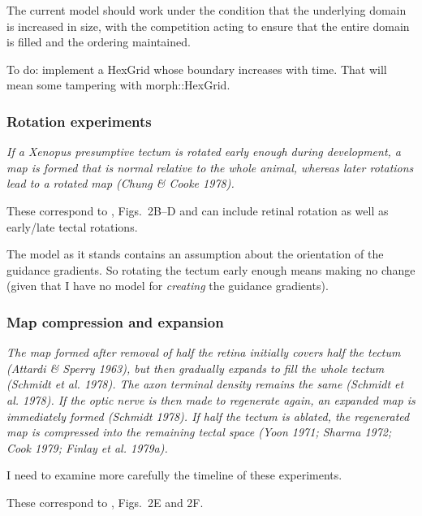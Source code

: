 \documentclass[11pt, a4paper]{article}
\newcommand{\code}[1]{\textsf{#1}}
\begin{document}
The current model should work under the condition that the underlying domain
is increased in size, with the competition acting to ensure that the entire
domain is filled and the ordering maintained.

To do: implement a HexGrid whose boundary increases with time. That will mean
some tampering with \code{morph::HexGrid}.

\subsubsection{Rotation experiments}

\begin{displayquote}
\emph{If a Xenopus presumptive tectum is rotated early enough during development,
a map is formed that is normal relative to the whole animal, whereas later
rotations lead to a rotated map (Chung \& Cooke 1978).}
\end{displayquote}

These correspond to \cite{goodhill_retinotectal_1999}, Figs.~2B--D and can
include retinal rotation as well as early/late tectal rotations.

The model as it stands contains an assumption about the orientation of the
guidance gradients. So rotating the tectum early enough means making no change
(given that I have no model for \emph{creating} the guidance gradients).

\subsubsection{Map compression and expansion}

\begin{displayquote}
\emph{The map formed after removal of half the retina initially covers half the
tectum (Attardi \& Sperry 1963), but then gradually expands to fill the whole
tectum (Schmidt et al. 1978). The axon terminal density remains the same
(Schmidt et al.  1978). If the optic nerve is then made to regenerate again,
an expanded map is immediately formed (Schmidt 1978). If half the tectum is
ablated, the regenerated map is compressed into the remaining tectal space
(Yoon 1971; Sharma 1972; Cook 1979; Finlay et al. 1979a).}
\end{displayquote}

I need to examine more carefully the timeline of these experiments.

These correspond to \cite{goodhill_retinotectal_1999}, Figs.~2E and 2F.
\end{document}
